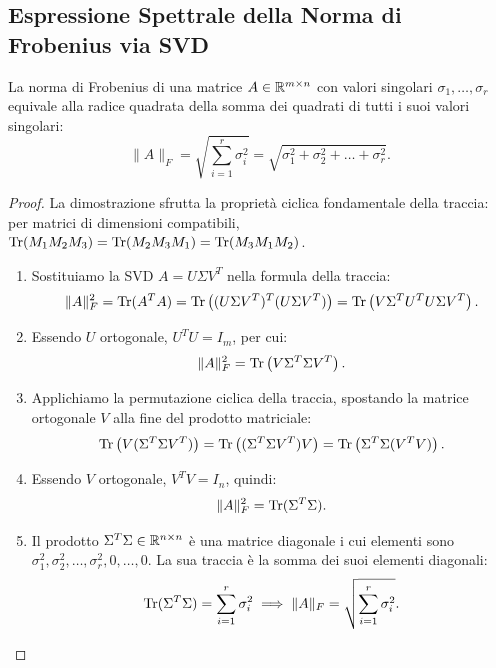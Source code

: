 \subsection{Espressione Spettrale della Norma di Frobenius via SVD}

\begin{theorem}
\label{thm:frobenius-valori-singolari}
La norma di Frobenius di una matrice $A \in \mathbb{R}^{m \times n}$ con valori singolari $\sigma_1, \dots, \sigma_r$ equivale alla radice quadrata della somma dei quadrati di tutti i suoi valori singolari:
\begin{equation}
    \|A\|_F = \sqrt{\sum_{i=1}^r \sigma_i^2} = \sqrt{\sigma_1^2 + \sigma_2^2 + \dots + \sigma_r^2}.
\end{equation}
\end{theorem}

\begin{proof}
La dimostrazione sfrutta la propriet\`a ciclica fondamentale della traccia: per matrici di dimensioni compatibili, $\operatorname{Tr}(M_1 M_2 M_3) = \operatorname{Tr}(M_2 M_3 M_1) = \operatorname{Tr}(M_3 M_1 M_2)$.
\begin{enumerate}
    \item Sostituiamo la SVD $A = U \Sigma V^T$ nella formula della traccia:
    \begin{equation}
        \|A\|_F^2 = \operatorname{Tr}(A^T A) = \operatorname{Tr}\left( (U \Sigma V^T)^T (U \Sigma V^T) \right) = \operatorname{Tr}\left( V \Sigma^T U^T U \Sigma V^T \right).
    \end{equation}
    \item Essendo $U$ ortogonale, $U^T U = I_m$, per cui:
    \begin{equation}
        \|A\|_F^2 = \operatorname{Tr}\left( V \Sigma^T \Sigma V^T \right).
    \end{equation}
    \item Applichiamo la permutazione ciclica della traccia, spostando la matrice ortogonale $V$ alla fine del prodotto matriciale:
    \begin{equation}
        \operatorname{Tr}\left( V (\Sigma^T \Sigma V^T) \right) = \operatorname{Tr}\left( (\Sigma^T \Sigma V^T) V \right) = \operatorname{Tr}\left( \Sigma^T \Sigma (V^T V) \right).
    \end{equation}
    \item Essendo $V$ ortogonale, $V^T V = I_n$, quindi:
    \begin{equation}
        \|A\|_F^2 = \operatorname{Tr}(\Sigma^T \Sigma).
    \end{equation}
    \item Il prodotto $\Sigma^T \Sigma \in \mathbb{R}^{n \times n}$ \`e una matrice diagonale i cui elementi sono $\sigma_1^2, \sigma_2^2, \dots, \sigma_r^2, 0, \dots, 0$. La sua traccia \`e la somma dei suoi elementi diagonali:
    \begin{equation}
        \operatorname{Tr}(\Sigma^T \Sigma) = \sum_{i=1}^r \sigma_i^2 \implies \|A\|_F = \sqrt{\sum_{i=1}^r \sigma_i^2}.
    \end{equation}
\end{enumerate}
\end{proof}

